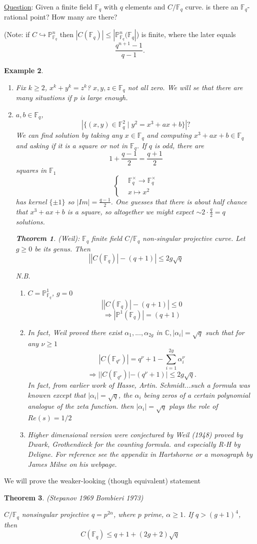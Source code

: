 \documentclass[11pt]{article}
\newtheorem{thm}{Theorem}[section]
\newtheorem{ex}[thm]{Example}
\newcommand{\proj}{\mathbb P}
\newcommand{\cplx}{\mathbb C}
\newcommand{\bbf}{\mathbb F}
\newcommand{\Lrta}{\Longrightarrow}
\newcommand{\lrta}{\longrightarrow}
\newcommand{\inj}{\hookrightarrow}
\begin{document}
\underline{Question}: Given a finite field $\bbf_q$  with $q$ elements and $C/\bbf_q$ curve. is there an $\bbf_q$-rational point? How many are there?

(Note: if $C\inj \proj^n_{\bbf_q}$ then $|C(\bbf_q)|\leq |\proj^n_{\bbf_q}(\bbf_q|$) is finite, where the later equals
$$
\frac{q^{n+1}-1}{q-1}.
$$
\begin{ex}
\begin{enumerate}[label=(\arabic*)]
\item
Fix $k\geq 2$, $x^k+y^k=z^k$? $x,y,z\in \bbf_q$ not all zero.
 We will se that there are many situations if $p$ is large enough.
 \item $a,b\in \bbf_q$, 
 $$
 \left|\{(x,y)\in \bbf_q^2\mid y^2=x^3+ax+b\}\right|?
 $$
We can find solution by taking any $x\in \bbf_q$ and computing $x^3+ax+b\in\bbf_q$ and asking if it is a square or not in $\bbf_q$. If $q$ is odd, there are
$$
1+\frac{q-1}{2}=\frac{q+1}{2}
$$
squares in $\bbf_1$
$$
\left\{
\begin{aligned}
& \bbf_q^\times\lrta\bbf_q^\times\\
& x\longmapsto x^2
\end{aligned}\right.
$$
has kernel $\{\pm 1\}$ so $|Im|=\frac{q-1}{2}$. One guesses that there is about half chance that $x^3+ax+b$ is a square, so altogether we might expect $\sim 2\cdot \frac{q}{2}=q$ solutions.

\begin{thm}
(Weil): $\bbf_q$ finite field $C/\bbf_q$ non-singular projective curve. Let $g\geq 0$ be its genus. Then $$\left||C(\bbf_q)|-(q+1)\right|\leq 2g \sqrt{q}$$
\end{thm}

N.B. 
\begin{enumerate}
\item 
$C=\proj^1_{\bbf_q}$, $g=0$
$$
\left||C(\bbf_q)|-(q+1)\right|\leq 0
$$
$$
\Lrta |\proj^1(\bbf_q)|=(q+1)
$$
\item In fact,  Weil proved there exist $\alpha_1,...,\alpha_{2g}$ in $\cplx, |\alpha_i|=\sqrt{q}$ such that for any $\nu\geq 1$
$$
|C(\bbf_{q^\nu})|=q^\nu+1-\sum_{i=1}^{2g}\alpha_i^\nu
$$
$$
\Lrta ||C(\bbf_{q^\nu})|-(q^\nu+1)|\leq 2g \sqrt{q}.
$$
In fact, from earlier work of Hasse, Artin. Schmidt...such a formula was  knowen except that $|\alpha_i|=\sqrt{q}$, the $\alpha_i$ being zeros of a certain polynomial analogue of the zeta function. then $|\alpha_i|=\sqrt{q}$ plays the role of $Re(s)=1/2$
\item Higher dimensional version were conjectured by Weil (1948) proved by Dwark, Grothendieck for the counting formula. and especially R-H by Deligne. For reference see the appendix in Hartshorne or a monograph by James Milne on his webpage.
\end{enumerate}
\end{enumerate}
\end{ex}
We will prove the weaker-looking (though equivalent) statement 
\begin{thm}
(Stepanov 1969 Bombieri 1973)

$C/\bbf_q$ nonsingular projective $q=p^{2\alpha}$, where $p$ prime, $\alpha\geq 1$. If $q> (g+1)^4$, then 
$$
C(\bbf_q)\leq q+1+(2g+2)\sqrt{q}
$$
\end{thm}
\end{document}
